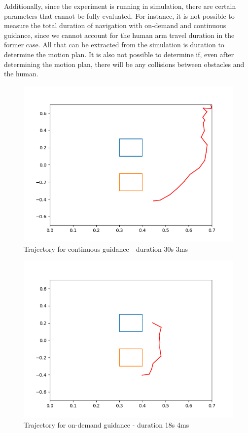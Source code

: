 Additionally, since the experiment is running in simulation, there are certain parameters that cannot be fully evaluated. 
For instance, it is not possible to measure the total duration of navigation with on-demand and continuous guidance, since we cannot account for the human arm travel duration in the former case. 
All that can be extracted from the simulation is duration to determine the motion plan. 
It is also not possible to determine if, even after determining the motion plan, there will be any collisions between obstacles and the human. 
\begin{figure}
    \centering
    \includegraphics[width = \linewidth]{img/continuous_30s03ms.png}
    \caption{Trajectory for continuous guidance - duration 30s 3ms}
    \label{fig:ContinuousGuidance}
\end{figure}
\begin{figure}
    \centering
    \includegraphics[width = \linewidth]{img/ondemand_18s03ms.png}
    \caption{Trajectory for on-demand guidance - duration 18s 4ms}
    \label{fig:OndemandGuidance}
\end{figure}
